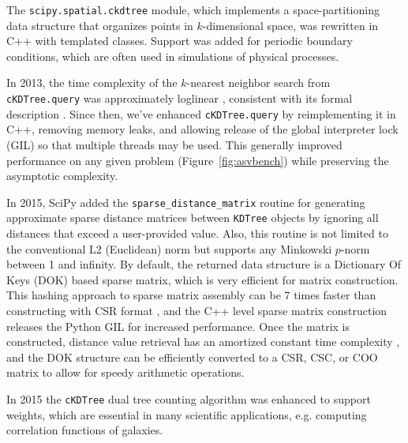 The \texttt{scipy.spatial.ckdtree} module, which implements a space-partitioning data structure that
organizes points in $k$-dimensional space, was rewritten in C++ with templated classes. 
Support was added for periodic boundary conditions, which are often used 
in simulations of physical processes. 

In 2013, the time complexity of the $k$-nearest neighbor search from
\texttt{cKDTree.query} was approximately loglinear \cite{knn-jake},
consistent with its formal description \cite{kdtree-search-algo}.
Since then, we've enhanced \texttt{cKDTree.query} by reimplementing it in
C++, removing memory leaks, and allowing release of the global interpreter lock (GIL) so that
multiple threads may be used\cite{gh-4374}. This generally improved
performance on any given problem (Figure~\ref{fig:asvbench})
while preserving the asymptotic complexity.

In 2015, SciPy added the \texttt{sparse\_distance\_matrix} routine for generating 
approximate sparse distance matrices between \texttt{KDTree} objects by ignoring 
all distances that exceed a user-provided value. Also, this routine is not 
limited to the conventional L2 (Euclidean) norm but supports any Minkowski 
$p$-norm between 1 and infinity. By default, the returned data structure is a
Dictionary Of Keys (DOK) based sparse matrix, which is very efficient for matrix 
construction. This hashing approach to sparse matrix assembly can be 7 times 
faster than constructing with CSR format
\cite{10.1007/978-3-540-75755-9_107}, and the C++ level sparse matrix construction 
releases the Python GIL for increased performance. Once the matrix is constructed, 
distance value retrieval has an amortized constant time complexity 
\cite{Cormen:2001:IA:580470}, and the DOK structure can be efficiently converted 
to a CSR, CSC, or COO matrix to allow for 
speedy arithmetic operations.

In 2015 the \texttt{cKDTree} dual tree counting algorithm\cite{Moore2000ar}
was enhanced to support weights\cite{ckdtree-weights}, which are
essential in many scientific applications, e.g. computing correlation
functions of galaxies\cite{0004-637X-750-1-38}.
